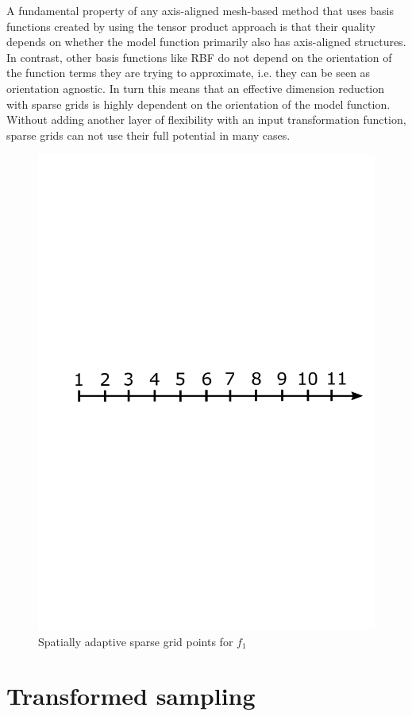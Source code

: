 \documentclass[
  a4paper,  %
  twoside,  %
  bibliography=totoc,
  headsepline,
  cleardoublepage=empty,
  parskip=half,
  draft=false
]{scrbook}
\begin{document}
A fundamental property of any axis-aligned mesh-based method that uses basis functions created by using the tensor product approach is that their quality depends on whether the model function primarily also has axis-aligned structures.
In contrast, other basis functions like RBF do not depend on the orientation of the function terms they are trying to approximate, i.e. they can be seen as orientation agnostic.
In turn this means that an effective dimension reduction with sparse grids is highly dependent on the orientation of the model function.
Without adding another layer of flexibility with an input transformation function, sparse grids can not use their full potential in many cases.



\begin{figure}[H]
  \centering
  \includegraphics[width=.8\linewidth]{graphics/dimension_range.pdf}
  \caption{Spatially adaptive sparse grid points for $f_1$}
  \label{fig:grid_errors}
\end{figure}




\section{Transformed sampling}
\end{document}
